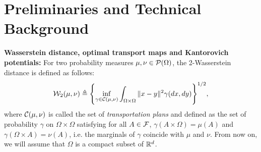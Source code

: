 
\section{Preliminaries and Technical Background}
\label{sec:techbg}





\vspace{-5pt}

\textbf{Wasserstein distance, optimal transport maps and Kantorovich potentials: }
%
For two probability measures $\mu,\nu \in {\cal P}(\Omega)$, the 2-Wasserstein distance is defined as follows:
\begin{align}
{\cal W}_2(\mu,\nu) \triangleq \Biggl\{ \inf_{\gamma \in {\cal C}(\mu,\nu)} \int_{\Omega \times \Omega} \|x-y\|^2 \gamma(dx , dy) \Biggr\}^{1/2}, \label{eqn:w2}
\end{align}
where ${\cal C}(\mu,\nu)$ is called the set of \emph{transportation plans} and defined as the set of probability $\gamma$ on $\Omega \times \Omega$ satisfying for all $A \in \mathcal{F}$, $\gamma(A \times \Omega) = \mu(A)$ and $\gamma(\Omega \times A)=\nu(A)$, i.e. the  marginals of $\gamma$  coincide with $\mu$ and $\nu$. From now on, we will assume that $\Omega$ is a compact subset of $\mathbb{R}^d$.


